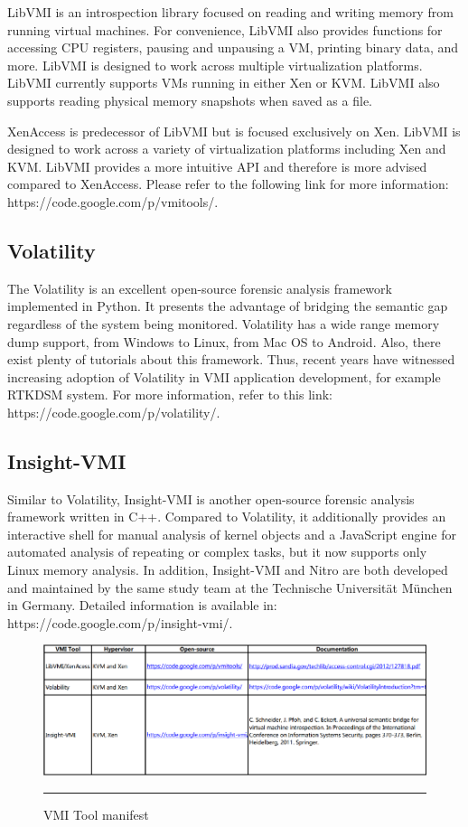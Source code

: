 LibVMI is an introspection library focused on reading and writing memory from running virtual machines. For convenience, LibVMI also provides functions for accessing CPU registers, pausing and unpausing a VM, printing binary data, and more. LibVMI is designed to work across multiple virtualization platforms. LibVMI currently supports VMs running in either Xen or KVM. LibVMI also supports reading physical memory snapshots when saved as a file.

XenAccess is predecessor of LibVMI but is focused exclusively on Xen. LibVMI is designed to work across a variety of virtualization platforms including Xen and KVM. LibVMI provides a more intuitive API and therefore is more advised compared to XenAccess. Please refer to the following link for more information: https://code.google.com/p/vmitools/. 

\subsection{Volatility  \citep{Reference13}}

The Volatility is an excellent open-source forensic analysis framework implemented in Python. It presents the advantage of bridging the semantic gap regardless of the system being monitored. Volatility has a wide range memory dump support, from Windows to Linux, from Mac OS to Android. Also, there exist plenty of tutorials about this framework. Thus, recent years have witnessed increasing adoption of Volatility in VMI application development, for example RTKDSM system. For more information, refer to this link: https://code.google.com/p/volatility/.

\subsection{Insight-VMI  \citep{Reference14,Reference15}}

Similar to Volatility, Insight-VMI is another open-source forensic analysis framework written in C++. Compared to Volatility, it additionally provides an interactive shell for manual analysis of kernel objects and a JavaScript engine for automated analysis of repeating or complex tasks, but it now supports only Linux memory analysis. In addition, Insight-VMI and Nitro are both developed and maintained by the same study team at the Technische Universität München in Germany. Detailed information is available in: https://code.google.com/p/insight-vmi/.

\begin{figure}[htbp]
	\centering
		\includegraphics{Figures/Figure3.pdf}
		\rule{35em}{0.5pt}
	\caption[VMI Tool manifest]{VMI Tool manifest}
	\label{fig:VMI Tool manifest}
\end{figure}



